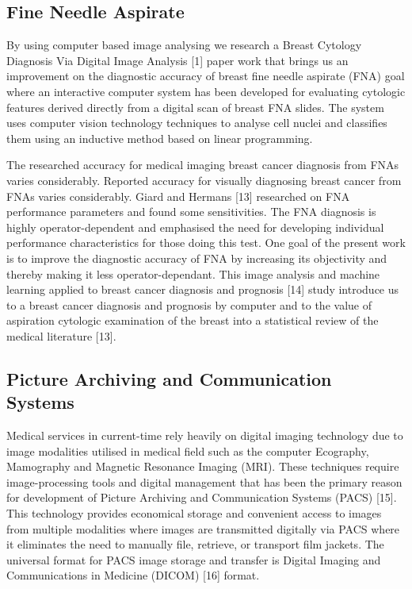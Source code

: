 \subsection{Fine Needle Aspirate}

By using computer based image analysing we research a Breast Cytology Diagnosis Via Digital Image Analysis [1] paper work that brings us an improvement on the diagnostic accuracy of breast fine needle aspirate (FNA) goal where an interactive computer system has been developed for evaluating cytologic features derived directly from a digital scan of breast FNA slides. The system uses computer vision technology techniques to analyse cell nuclei and classifies them using an inductive method based on linear programming.

\clearpage

The researched accuracy for medical imaging breast cancer diagnosis from FNAs varies considerably. Reported accuracy for visually diagnosing breast cancer from FNAs varies considerably. Giard and Hermans [13] researched on FNA performance parameters and found some sensitivities. The FNA diagnosis is highly operator-dependent and emphasised the need for developing individual performance characteristics for those doing this test. One goal of the present work is to improve the diagnostic accuracy of FNA by increasing its objectivity and thereby making it less operator-dependant. This image analysis and machine learning applied to breast cancer diagnosis and prognosis [14] study introduce us to a breast cancer diagnosis and prognosis by computer and to the value of aspiration cytologic examination of the breast into a statistical review of the medical literature [13].

\subsection{Picture Archiving and Communication Systems}

Medical services in current-time rely heavily on digital imaging technology due to image modalities utilised in medical field such as the computer Ecography, Mamography and Magnetic Resonance Imaging (MRI). These techniques require image-processing tools and digital management that has been the primary reason for development of Picture Archiving and Communication Systems (PACS) [15]. This technology provides economical storage and convenient access to images from multiple modalities where images are transmitted digitally via PACS where it eliminates the need to manually file, retrieve, or transport film jackets. The universal format for PACS image storage and transfer is Digital Imaging and Communications in Medicine (DICOM) [16] format.

